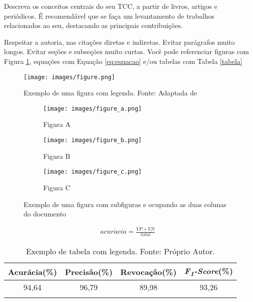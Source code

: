 Descreva os conceitos centrais do seu TCC, a partir de livros, artigos e periódicos. É recomendável que se faça um levantamento de trabalhos relacionados ao seu, destacando as principais contribuições.

Respeitar a autoria, nas citações diretas e indiretas. Evitar parágrafos muito longos. Evitar seções e subseções muito curtas. Você pode referenciar figuras com Figura \ref{fig:figura}, equações com Equação \ref{eq:equacao} e/ou tabelas com Tabela \ref{tabela}

\begin{figure}[htbp]
    \centerline{\texttt{[image: images/figure.png]}}
    \caption{Exemplo de uma figura com legenda. Fonte: Adaptada de \cite{gonzales2009}}
    \label{fig:figura}
\end{figure}

\begin{figure*}[htbp]
    \centering
    \begin{subfigure}[]{0.329\textwidth}
        \centerline{ \texttt{[image: images/figure\_a.png]} }
        \caption{Figura A}
        \label{fig:figura_2a}
    \end{subfigure}
    \hfill
    \begin{subfigure}[]{0.329\textwidth}
        \centerline{ \texttt{[image: images/figure\_b.png]} }
        \caption{Figura B}
        \label{fig:figura_2b}
    \end{subfigure}
    \hfill
    \begin{subfigure}[]{0.329\textwidth}
        \centerline{ \texttt{[image: images/figure\_c.png]} }
        \caption{Figura C}
        \label{fig:figura_2c}
    \end{subfigure}
    \caption{Exemplo de uma figura com subfiguras e ocupando as duas colunas do documento}
    \label{fig:figura_ocupando_duas_colunas}
\end{figure*}

\begin{align} \label{eq:equacao}
    acur\acute{a}cia = \frac{VP + VN}{total}
\end{align}

\begin{table}[htbp]
    \begin{center}
        \renewcommand{\arraystretch}{1.4}
        \caption{Exemplo de tabela com legenda. Fonte: Próprio Autor.}
        \begin{tabular}{*{4}{c}}%
            \hline
            Acurácia(\%)   & Precisão(\%) & Revocação(\%)    & \textit{F\textsubscript{1}-Score}(\%) \\ \hline
            94,64           & 96,79         & 89,98             & 93,26         \\
            \label{tab:tabela}
        \end{tabular}
    \end{center}
\end{table}